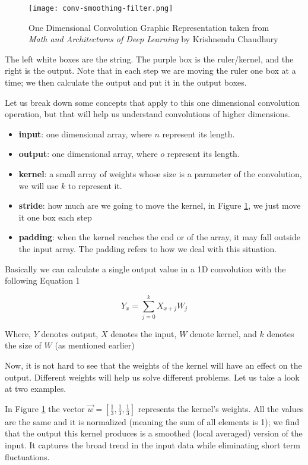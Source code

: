 \documentclass[10pt, twocolumn]{article}
\begin{document}
\begin{figure}[ht]
  \texttt{[image: conv-smoothing-filter.png]}
  \caption{One Dimensional Convolution Graphic Representation taken from \emph{Math and
Architectures of Deep Learning} by Krishnendu Chaudhury}
  \label{fig:onedimensional}
\end{figure}

The left white boxes are the string. The purple box is the ruler/kernel, and
the right is the output. Note that in each step we are moving the ruler one box
at a time; we then calculate the output and put it in the output boxes.

Let us break down some concepts that apply to this one dimensional convolution
operation, but that will help us understand convolutions of higher
dimensions.

\begin{itemize}
    \item \textbf{input}: one dimensional array, where $n$ represent its
        length.
    \item \textbf{output}: one dimensional array, where $o$ represent
        its length.
    \item \textbf{kernel}: a small array of weights whose size is
        a parameter of the convolution, we will use $k$ to represent it.
    \item \textbf{stride}: how much are we going to move the kernel, in
        Figure \ref{fig:onedimensional}, we just move it one box each step
    \item \textbf{padding}: when the kernel reaches the end or of the array, it
        may fall outside the input array. The padding refers to how we deal
        with this situation.
\end{itemize}

Basically we can calculate a single output value in a 1D convolution with the
following Equation 1

\begin{equation}
    Y_x = \sum_{j=0}^{k} X_{x+j} W_j
\end{equation}

Where, $Y$ denotes output, $X$ denotes the input, $W$ denote kernel, and $k$
denotes the size of $W$ (as mentioned earlier)

Now, it is not hard to see that the weights of the kernel will have an effect
on the output. Different weights will help us solve different problems. Let us
take a look at two examples.

In Figure \ref{fig:onedimensional} the vector $\vec{w} =
[\frac{1}{3},\frac{1}{3},\frac{1}{3}]$ represents the kernel's weights. All the
values are the same and it is normalized (meaning the sum of all elements is
1); we find that the output this kernel produces is a smoothed (local
averaged) version of the input. It captures the broad trend in the input data
while eliminating short term fluctuations.
\end{document}
